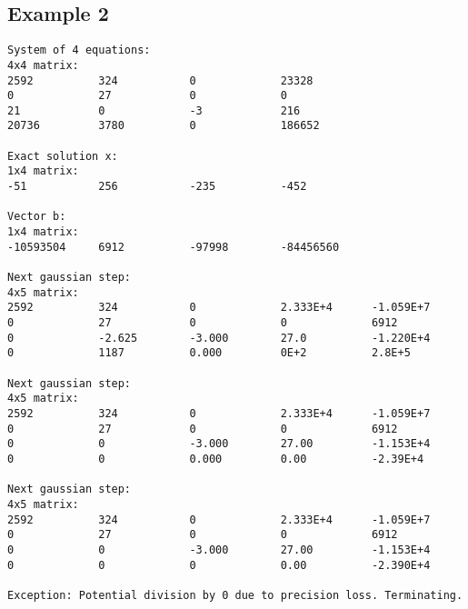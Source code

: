 \documentclass[letterpaper,12pt]{article}
\begin{document}
\subsection{Example 2}
\label{a:E2}
\begin{verbatim}
System of 4 equations:
4x4 matrix:
2592          324           0             23328         
0             27            0             0             
21            0             -3            216           
20736         3780          0             186652        

Exact solution x:
1x4 matrix:
-51           256           -235          -452          

Vector b:
1x4 matrix:
-10593504     6912          -97998        -84456560     

Next gaussian step:
4x5 matrix:
2592          324           0             2.333E+4      -1.059E+7     
0             27            0             0             6912          
0             -2.625        -3.000        27.0          -1.220E+4     
0             1187          0.000         0E+2          2.8E+5        

Next gaussian step:
4x5 matrix:
2592          324           0             2.333E+4      -1.059E+7     
0             27            0             0             6912          
0             0             -3.000        27.00         -1.153E+4     
0             0             0.000         0.00          -2.39E+4      

Next gaussian step:
4x5 matrix:
2592          324           0             2.333E+4      -1.059E+7     
0             27            0             0             6912          
0             0             -3.000        27.00         -1.153E+4     
0             0             0             0.00          -2.390E+4     

Exception: Potential division by 0 due to precision loss. Terminating.
\end{verbatim}
\end{document}
